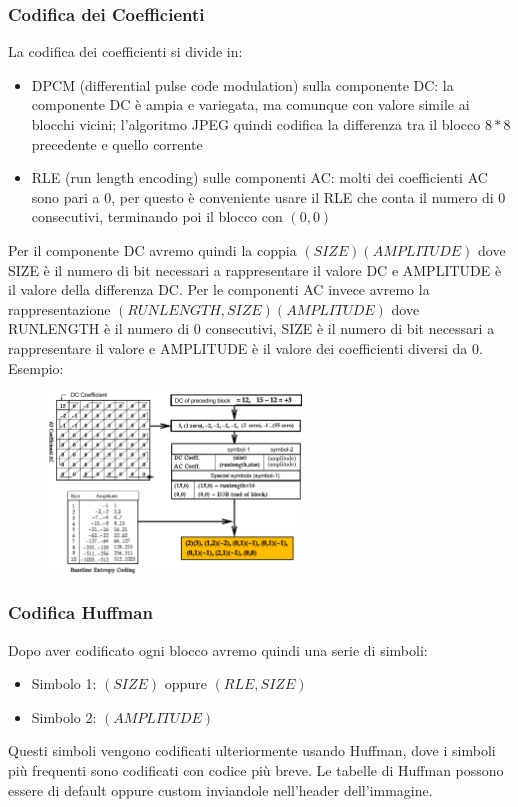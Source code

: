 \documentclass[a4paper,11pt]{article} %
\begin{document}
\subsubsection{Codifica dei Coefficienti}
La codifica dei coefficienti si divide in: 
\begin{itemize}
\item DPCM (differential pulse code modulation) sulla componente DC: la componente DC è ampia e variegata, ma comunque con valore simile ai blocchi vicini; l'algoritmo JPEG quindi codifica la differenza tra il blocco $8*8$ precedente e quello corrente
\item RLE (run length encoding) sulle componenti AC: molti dei coefficienti AC sono pari a 0, per questo è conveniente usare il RLE che conta il numero di 0 consecutivi, terminando poi il blocco con $(0,0)$
\end{itemize}
Per il componente DC avremo quindi la coppia $(SIZE)(AMPLITUDE)$ dove SIZE è il numero di bit necessari a rappresentare il valore DC e AMPLITUDE è il valore della differenza DC. Per le componenti AC invece avremo la rappresentazione $(RUNLENGTH,SIZE)(AMPLITUDE)$ dove RUNLENGTH è il numero di 0 consecutivi, SIZE è il numero di bit necessari a rappresentare il valore e AMPLITUDE è il valore dei coefficienti diversi da 0.
\newpage
Esempio: 
\begin{figure} [h]
\centering
\includegraphics[width=0.6\textwidth]{Coefficient encoding}
\end{figure}

\subsubsection{Codifica Huffman}
Dopo aver codificato ogni blocco avremo quindi una serie di simboli: 
\begin{itemize}
\item Simbolo 1: $(SIZE)$ oppure $(RLE,SIZE)$
\item Simbolo 2: $(AMPLITUDE)$
\end{itemize}
Questi simboli vengono codificati ulteriormente usando Huffman, dove i simboli più frequenti sono codificati con codice più breve. Le tabelle di Huffman possono essere di default oppure custom inviandole nell'header dell'immagine.
\end{document}
